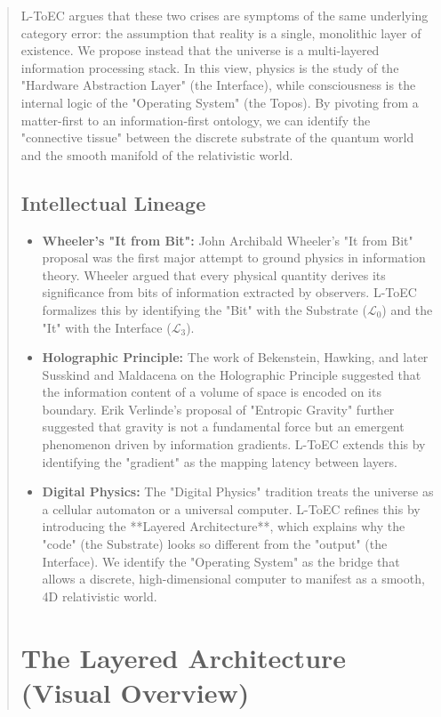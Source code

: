 \documentclass[11pt,titlepage]{article}
\newcommand{\substrate}{\mathcal{L}_0}
\newcommand{\interface}{\mathcal{L}_3}
\begin{document}
\begin{abstract}
L-ToEC argues that these two crises are symptoms of the same underlying category error: the assumption that reality is a single, monolithic layer of existence. We propose instead that the universe is a multi-layered information processing stack. In this view, physics is the study of the "Hardware Abstraction Layer" (the Interface), while consciousness is the internal logic of the "Operating System" (the Topos). By pivoting from a matter-first to an information-first ontology, we can identify the "connective tissue" between the discrete substrate of the quantum world and the smooth manifold of the relativistic world.

\subsection{Intellectual Lineage}
\begin{itemize}
    
\item \textbf{Wheeler's "It from Bit":} John Archibald Wheeler's "It from Bit" proposal was the first major attempt to ground physics in information theory. Wheeler argued that every physical quantity derives its significance from bits of information extracted by observers. L-ToEC formalizes this by identifying the "Bit" with the Substrate ($\substrate$) and the "It" with the Interface ($\interface$).
    
\item \textbf{Holographic Principle:} The work of Bekenstein, Hawking, and later Susskind and Maldacena on the Holographic Principle suggested that the information content of a volume of space is encoded on its boundary. Erik Verlinde's proposal of "Entropic Gravity" further suggested that gravity is not a fundamental force but an emergent phenomenon driven by information gradients. L-ToEC extends this by identifying the "gradient" as the mapping latency between layers.
    
\item \textbf{Digital Physics:} The "Digital Physics" tradition treats the universe as a cellular automaton or a universal computer. L-ToEC refines this by introducing the **Layered Architecture**, which explains why the "code" (the Substrate) looks so different from the "output" (the Interface). We identify the "Operating System" as the bridge that allows a discrete, high-dimensional computer to manifest as a smooth, 4D relativistic world.
\end{itemize}

\section{The Layered Architecture (Visual Overview)}
\begin{center}
\end{center}
\end{abstract}
\end{document}
